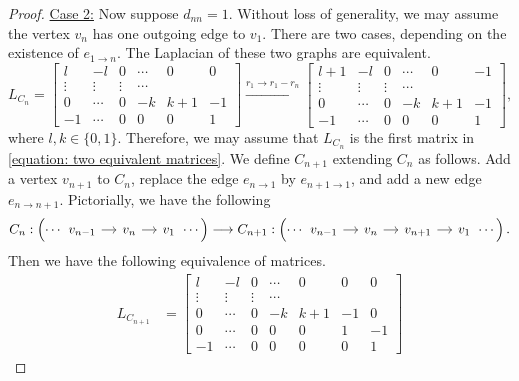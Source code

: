 \documentclass[11pt,reqno]{amsart}
\theoremstyle{definition}
\theoremstyle{plain}
\begin{document}
\begin{proof}
\noindent \underline{Case 2:} Now suppose $d_{nn} = 1$. Without loss of generality, we may assume the vertex $v_n$ has one outgoing edge to $v_1$. 
			There are two cases, depending on the existence of $e_{1\to n}$.
			The Laplacian of these two graphs are equivalent. 
\begin{equation}\label{equation: two equivalent matrices}
			L_{C_n} = \begin{bmatrix}
				l  & -l & 0 & \cdots & 0 & 0 \\
				\vdots & \vdots & \vdots & \cdots \\
				0 & \cdots & 0 & -k & k+1 & -1 \\
				-1 & \cdots & 0 & 0 & 0 & 1 
			\end{bmatrix}
			\stackrel{r_{1}\to r_1  - r_n}\longrightarrow
			\begin{bmatrix}
				l+1  & -l & 0 & \cdots & 0 & -1 \\
				\vdots & \vdots & \vdots & \cdots \\
				0 & \cdots & 0 & -k & k+1 & -1 \\
				-1 & \cdots & 0 & 0 & 0 & 1 
			\end{bmatrix},
\end{equation}
where $l, k \in \{ 0, 1 \}$. Therefore, we may assume that $L_{C_n}$ is the first matrix in \eqref{equation: two equivalent matrices}. We define $C_{n+1}$ extending $C_n$ as follows. Add a vertex $v_{n+1}$ to $C_n$, replace the edge $e_{n \to 1}$ by $e_{n+1 \to 1}$, and add a new edge $e_{n \to n+1}$. Pictorially, we have the following
\[
C_n: \left( \cdots \begin{tikzcd}[column sep=0.4cm]
					v_{n-1} \arrow[r] & v_n \arrow[r] & v_1 
				\end{tikzcd} \cdots \right)
				\longrightarrow
				C_{n+1}: \left( \cdots \begin{tikzcd}[column sep=0.4cm]
					v_{n-1} \arrow[r] & v_n \arrow[r] & v_{n+1} \arrow[r] & v_1 
				\end{tikzcd} \cdots \right).
			\]
	Then we have the following equivalence of matrices.
			\begin{align}
			L_{C_{n+1}} &= 
			\begin{bmatrix} 
				l  & -l & 0 & \cdots & 0 & 0 & 0 \\
				\vdots & \vdots & \vdots & \cdots \\
				0 & \cdots & 0 & -k & k+1 & -1 & 0  \\
				0 & \cdots & 0 & 0 & 0 & 1 & -1 \\ 
				-1 & \cdots & 0 & 0 & 0 & 0 & 1 

\end{bmatrix}
\end{align}
\end{proof}
\end{document}

